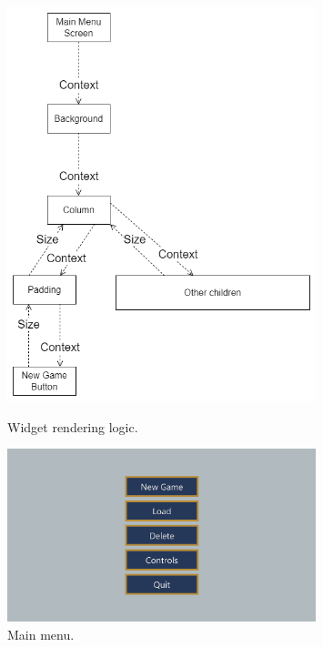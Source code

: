 \begin{figure}[H]
    \centering
    \begin{minipage}{0.45\textwidth}
        \centering
        \includegraphics[width=0.8\textwidth]{chapters/two_dimensional_graphics/resources/widget_logic.drawio.png}
        \caption{Widget rendering logic.}
        \label{fig:widget_logic}
    \end{minipage}\hfill
    \begin{minipage}{0.45\textwidth}
        \centering
        \includegraphics[width=0.8\textwidth]{chapters/two_dimensional_graphics/resources/main-menu.png}
        \caption{Main menu.}
        \label{fig:main_menu}
    \end{minipage}
\end{figure}